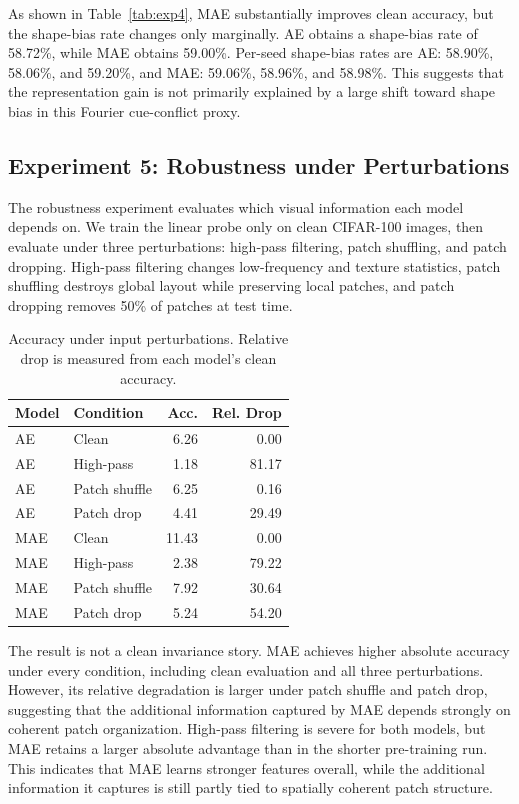 \documentclass[10pt,twocolumn,letterpaper]{article}
\begin{document}
As shown in Table~\ref{tab:exp4}, MAE substantially improves clean accuracy, but the shape-bias rate changes only marginally. AE obtains a shape-bias rate of 58.72\%, while MAE obtains 59.00\%. Per-seed shape-bias rates are AE: 58.90\%, 58.06\%, and 59.20\%, and MAE: 59.06\%, 58.96\%, and 58.98\%. This suggests that the representation gain is not primarily explained by a large shift toward shape bias in this Fourier cue-conflict proxy.

\subsection{Experiment 5: Robustness under Perturbations}

The robustness experiment evaluates which visual information each model depends on. We train the linear probe only on clean CIFAR-100 images, then evaluate under three perturbations: high-pass filtering, patch shuffling, and patch dropping. High-pass filtering changes low-frequency and texture statistics, patch shuffling destroys global layout while preserving local patches, and patch dropping removes 50\% of patches at test time.

\begin{table}[t]
\centering
\caption{Accuracy under input perturbations. Relative drop is measured from each model's clean accuracy.}
\label{tab:exp5}
\begin{tabular}{llrr}
\toprule
Model & Condition & Acc. & Rel. Drop \\
\midrule
AE  & Clean & 6.26 & 0.00 \\
AE  & High-pass & 1.18 & 81.17 \\
AE  & Patch shuffle & 6.25 & 0.16 \\
AE  & Patch drop & 4.41 & 29.49 \\
\midrule
MAE & Clean & 11.43 & 0.00 \\
MAE & High-pass & 2.38 & 79.22 \\
MAE & Patch shuffle & 7.92 & 30.64 \\
MAE & Patch drop & 5.24 & 54.20 \\
\bottomrule
\end{tabular}
\end{table}

The result is not a clean invariance story. MAE achieves higher absolute accuracy under every condition, including clean evaluation and all three perturbations. However, its relative degradation is larger under patch shuffle and patch drop, suggesting that the additional information captured by MAE depends strongly on coherent patch organization. High-pass filtering is severe for both models, but MAE retains a larger absolute advantage than in the shorter pre-training run. This indicates that MAE learns stronger features overall, while the additional information it captures is still partly tied to spatially coherent patch structure.
\end{document}
